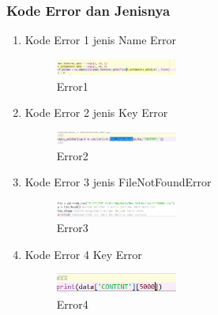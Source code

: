         \subsubsection{Kode Error dan Jenisnya}
        \begin{enumerate}
            \item Kode Error 1 jenis Name Error
            \begin{figure}[H]
                \includegraphics[width=4cm]{figures/1174086/chapter4/err1.png}
                \centering
                \caption{Error1}
            \end{figure}
            \item Kode Error 2 jenis Key Error
            \begin{figure}[H]
                \includegraphics[width=4cm]{figures/1174086/chapter4/err2.png}
                \centering
                \caption{Error2}
            \end{figure}
            \item Kode Error 3 jenis FileNotFoundError
            \begin{figure}[H]
                \includegraphics[width=4cm]{figures/1174086/chapter4/err3.png}
                \centering
                \caption{Error3}
            \end{figure}
            \item Kode Error 4 Key Error
            \begin{figure}[H]
                \includegraphics[width=4cm]{figures/1174086/chapter4/err4.png}
                \centering
                \caption{Error4}
            \end{figure}
        \end{enumerate}
